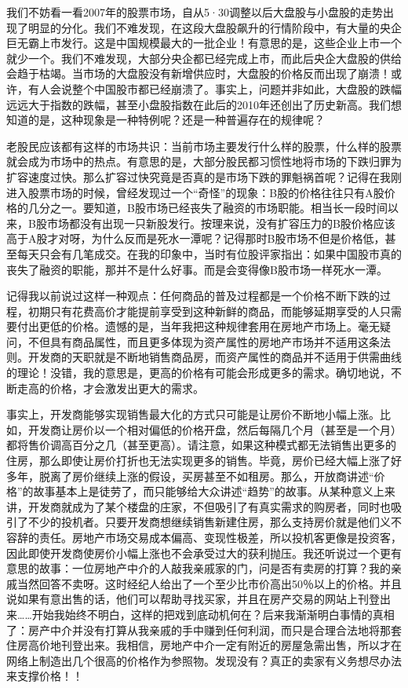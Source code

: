 我们不妨看一看2007年的股票市场，自从5·30调整以后大盘股与小盘股的走势出现了明显的分化。我们不难发现，在这段大盘股飙升的行情阶段中，有大量的央企巨无霸上市发行。这是中国规模最大的一批企业！有意思的是，这些企业上市一个就少一个。我们不难发现，大部分央企都已经完成上市，而此后央企大盘股的供给会趋于枯竭。当市场的大盘股没有新增供应时，大盘股的价格反而出现了崩溃！或许，有人会说整个中国股市都已经崩溃了。事实上，问题并非如此，大盘股的跌幅远远大于指数的跌幅，甚至小盘股指数在此后的2010年还创出了历史新高。我们想知道的是，这种现象是一种特例呢？还是一种普遍存在的规律呢？

老股民应该都有这样的市场共识：当前市场主要发行什么样的股票，什么样的股票就会成为市场中的热点。有意思的是，大部分股民都习惯性地将市场的下跌归罪为扩容速度过快。那么扩容过快究竟是否真的是市场下跌的罪魁祸首呢？记得在我刚进入股票市场的时候，曾经发现过一个“奇怪”的现象：B股的价格往往只有A股价格的几分之一。要知道，B股市场已经丧失了融资的市场职能。相当长一段时间以来，B股市场都没有出现一只新股发行。按理来说，没有扩容压力的B股价格应该高于A股才对呀，为什么反而是死水一潭呢？记得那时B股市场不但是价格低，甚至每天只会有几笔成交。在我的印象中，当时有位股评家指出：如果中国股市真的丧失了融资的职能，那并不是什么好事。而是会变得像B股市场一样死水一潭。

记得我以前说过这样一种观点：任何商品的普及过程都是一个价格不断下跌的过程，初期只有花费高价才能提前享受到这种新鲜的商品，而能够延期享受的人只需要付出更低的价格。遗憾的是，当年我把这种规律套用在房地产市场上。毫无疑问，不但具有商品属性，而且更多体现为资产属性的房地产市场并不适用这条法则。开发商的天职就是不断地销售商品房，而资产属性的商品并不适用于供需曲线的理论！没错，我的意思是，更高的价格有可能会形成更多的需求。确切地说，不断走高的价格，才会激发出更大的需求。

事实上，开发商能够实现销售最大化的方式只可能是让房价不断地小幅上涨。比如，开发商让房价以一个相对偏低的价格开盘，然后每隔几个月（甚至是一个月）都将售价调高百分之几（甚至更高）。请注意，如果这种模式都无法销售出更多的住房，那么即使让房价打折也无法实现更多的销售。毕竟，房价已经大幅上涨了好多年，脱离了房价继续上涨的假设，买房甚至不如租房。那么，开放商讲述“价格”的故事基本上是徒劳了，而只能够给大众讲述“趋势”的故事。从某种意义上来讲，开发商就成为了某个楼盘的庄家，不但吸引了有真实需求的购房者，同时也吸引了不少的投机者。只要开发商想继续销售新建住房，那么支持房价就是他们义不容辞的责任。房地产市场交易成本偏高、变现性极差，所以投机客更像是投资客，因此即使开发商使房价小幅上涨也不会承受过大的获利抛压。我还听说过一个更有意思的故事：一位房地产中介的人敲我亲戚家的门，问是否有卖房的打算？我的亲戚当然回答不卖呀。这时经纪人给出了一个至少比市价高出50％以上的价格。并且说如果有意出售的话，他们可以帮助寻找买家，并且在房产交易的网站上刊登出来……开始我始终不明白，这样的把戏到底动机何在？后来我渐渐明白事情的真相了：房产中介并没有打算从我亲戚的手中赚到任何利润，而只是合理合法地将那套住房高价地刊登出来。我相信，房地产中介一定有附近的房屋急需出售，所以才在网络上制造出几个很高的价格作为参照物。发现没有？真正的卖家有义务想尽办法来支撑价格！！

